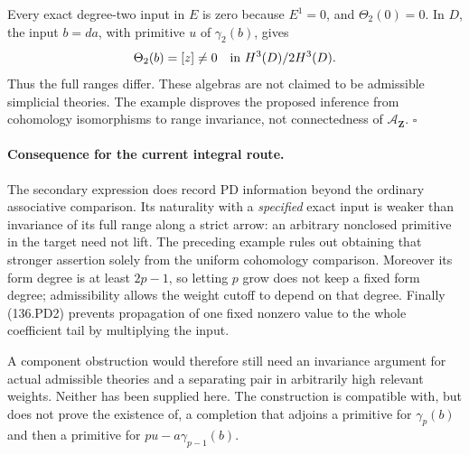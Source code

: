 Every exact degree-two input in \(E\) is zero because \(E^1=0\),
and \(\Theta_2(0)=0\). In \(D\), the input \(b=da\), with
primitive \(u\) of \(\gamma_2(b)\), gives
\[
                   \Theta_2(b)=[z]\neq0
                       \quad\hbox{in }H^3(D)/2H^3(D).
\]
Thus the full ranges differ. These algebras are not claimed to be
admissible simplicial theories. The example disproves the proposed
inference from cohomology isomorphisms to range invariance, not
connectedness of \(\mathcal A_{\mathbf Z}\). \(\square\)

\paragraph{Consequence for the current integral route.}
The secondary expression does record PD information beyond the
ordinary associative comparison. Its naturality with a
\emph{specified} exact input is weaker than invariance of its full
range along a strict arrow: an arbitrary nonclosed primitive in the
target need not lift. The preceding example rules out obtaining
that stronger assertion solely from the uniform cohomology
comparison. Moreover its form degree is at least \(2p-1\), so
letting \(p\) grow does not keep a fixed form degree; admissibility
allows the weight cutoff to depend on that degree. Finally
(136.PD2) prevents propagation of one fixed nonzero value to the
whole coefficient tail by multiplying the input.

A component obstruction would therefore still need an invariance
argument for actual admissible theories and a separating pair in
arbitrarily high relevant weights. Neither has been supplied here.
The construction is compatible with, but does not prove the
existence of, a completion that adjoins a primitive for
\(\gamma_p(b)\) and then a primitive for
\(p u-a\gamma_{p-1}(b)\).
